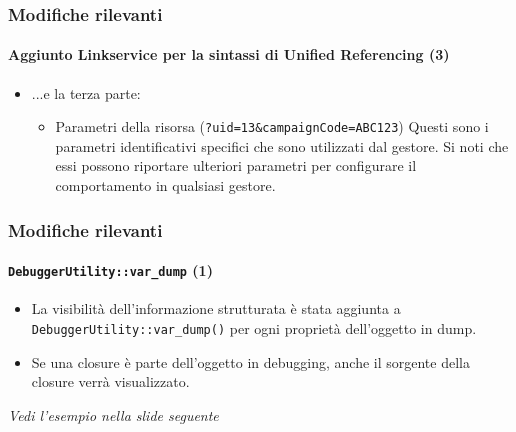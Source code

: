 \begin{frame}[fragile]
	\frametitle{Modifiche rilevanti}
	\framesubtitle{Aggiunto Linkservice per la sintassi di Unified Referencing (3)}

	\begin{itemize}

		\item ...e la terza parte:

			\begin{itemize}

				\item Parametri della risorsa (\texttt{?uid=13\&campaignCode=ABC123})\newline
					Questi sono i parametri identificativi specifici che sono utilizzati dal gestore.
					Si noti che essi possono riportare ulteriori parametri per configurare il comportamento in qualsiasi gestore.

			\end{itemize}

	\end{itemize}

\end{frame}

\begin{frame}[fragile]
	\frametitle{Modifiche rilevanti}
	\framesubtitle{\texttt{DebuggerUtility::var\_dump} (1)}

	\begin{itemize}

		\item La visibilità dell'informazione strutturata è stata aggiunta a \texttt{DebuggerUtility::var\_dump()}
			\newline
			per ogni proprietà dell'oggetto in dump.

		\item Se una closure è parte dell'oggetto in debugging, anche il sorgente della closure verrà visualizzato.

	\end{itemize}

	\tabto{0.75cm}\textit{Vedi l'esempio nella slide seguente}

\end{frame}

